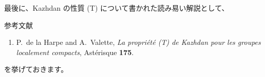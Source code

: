 \documentclass[uplatex,dvipdfmx]{jlreq}
\begin{document}
最後に、Kazhdan の性質 (T) について書かれた読み易い解説として、

\begin{center}
  \textsc{参考文献}
\end{center}
\begin{enumerate}
  \item[{[HV]}] P.~de la Harpe and A.~Valette,
        \textit{La propriété (T) de Kazhdan pour les groupes localement compacts},
        Astérisque \textbf{175}.
\end{enumerate}

\noindent
を挙げておきます。
\end{document}
